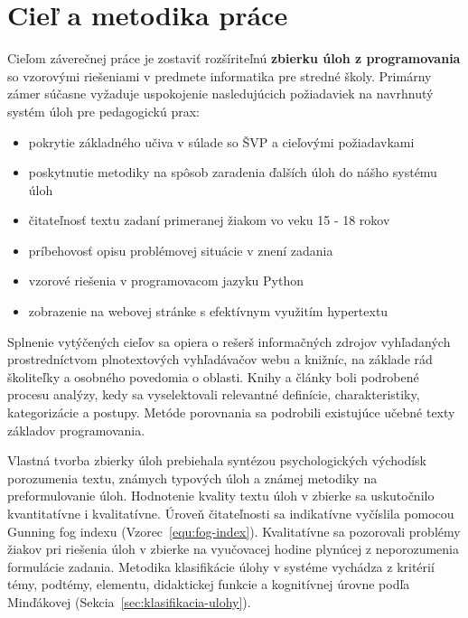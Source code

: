 \chapter{Cieľ a metodika práce}
Cieľom záverečnej práce je zostaviť rozšíriteľnú \textbf{zbierku úloh z programovania} so vzorovými riešeniami v predmete informatika pre stredné školy. Primárny zámer súčasne vyžaduje uspokojenie nasledujúcich požiadaviek na navrhnutý systém úloh pre pedagogickú prax:

\begin{itemize}[noitemsep]
\item pokrytie základného učiva v súlade so ŠVP a cieľovými požiadavkami
\item poskytnutie metodiky na spôsob zaradenia ďalších úloh do nášho systému úloh
\item čitateľnosť textu zadaní primeranej žiakom vo veku 15 - 18 rokov
\item príbehovosť opisu problémovej situácie v znení zadania
\item vzorové riešenia v programovacom jazyku Python
\item zobrazenie na webovej stránke s efektívnym využitím hypertextu
\end{itemize}

Splnenie vytýčených cieľov sa opiera o rešerš informačných zdrojov vyhľadaných prostredníctvom plnotextových vyhľadávačov webu a knižníc, na základe rád školiteľky a osobného povedomia o oblasti. Knihy a články boli podrobené procesu analýzy, kedy sa vyselektovali relevantné definície, charakteristiky, kategorizácie a postupy. Metóde porovnania sa podrobili existujúce učebné texty základov programovania.

Vlastná tvorba zbierky úloh prebiehala syntézou psychologických východísk porozumenia textu, známych typových úloh a známej metodiky na preformulovanie úloh. Hodnotenie kvality textu úloh v zbierke sa uskutočnilo kvantitatívne i kvalitatívne. Úroveň čitateľnosti sa indikatívne vyčíslila pomocou Gunning fog indexu (Vzorec~\ref{equ:fog-index}). Kvalitatívne sa pozorovali problémy žiakov pri riešenia úloh v zbierke na vyučovacej hodine plynúcej z neporozumenia formulácie zadania. Metodika klasifikácie úlohy v systéme vychádza z kritérií témy, podtémy, elementu, didaktickej funkcie a kognitívnej úrovne podľa Minďákovej (Sekcia~\ref{sec:klasifikacia-ulohy}).
